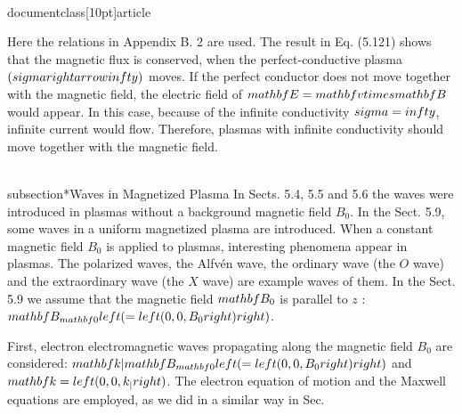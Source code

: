 \\documentclass[10pt]{article}
\begin{document}
{{{{Here the relations in Appendix B. 2 are used. The result in Eq. (5.121) shows that the magnetic flux is conserved, when the perfect-conductive plasma $(\\sigma \\rightarrow \\infty)$ moves. If the perfect conductor does not move together with the magnetic field, the electric field of $\\mathbf{E}=\\mathbf{v} \\times \\mathbf{B}$ would appear. In this case, because of the infinite conductivity $\\sigma=\\infty$, infinite current would flow. Therefore, plasmas with infinite conductivity should move together with the magnetic field.

\\subsection*{Waves in Magnetized Plasma}
In Sects. 5.4, 5.5 and 5.6 the waves were introduced in plasmas without a background magnetic field $B_{0}$. In the Sect. 5.9, some waves in a uniform magnetized plasma are introduced. When a constant magnetic field $B_{0}$ is applied to plasmas, interesting phenomena appear in plasmas. The polarized waves, the Alfvén wave, the ordinary wave (the $O$ wave) and the extraordinary wave (the $X$ wave) are example waves of them. In the Sect. 5.9 we assume that the magnetic field $\\mathbf{B}_{0}$ is parallel to $z$ : $\\mathbf{B}_{\\mathbf{0}}\\left(=\\left(0,0, B_{0}\\right)\\right)$.

First, electron electromagnetic waves propagating along the magnetic field $B_{0}$ are considered: $\\mathbf{k} \\| \\mathbf{B}_{\\mathbf{0}}\\left(=\\left(0,0, B_{0}\\right)\\right)$ and $\\mathbf{k}=\\left(0,0, k_{\\|}\\right)$. The electron equation of motion and the Maxwell equations are employed, as we did in a similar way in Sec.

}}}}
\end{document}
